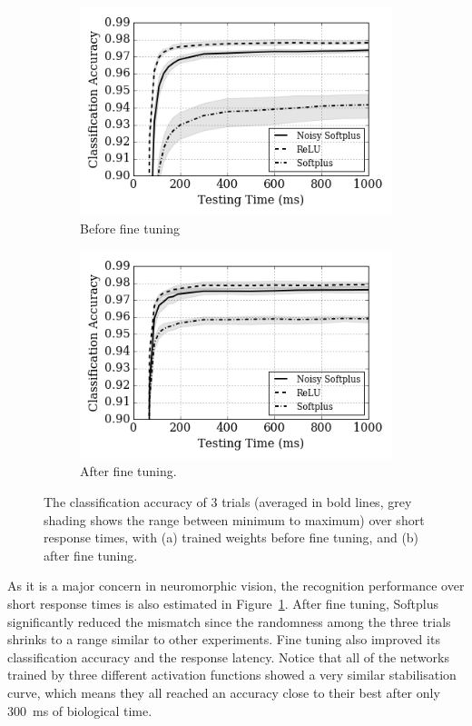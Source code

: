 	\begin{figure}[htb!]
		\centering
		\begin{subfigure}[t]{0.49\textwidth}
			\includegraphics[width=\textwidth]{pics_iconip/8-2.png}
			\caption{Before fine tuning}
		\end{subfigure}
		\begin{subfigure}[t]{0.49\textwidth}
			\includegraphics[width=\textwidth]{pics_iconip/8-3.png}
			\caption{After fine tuning.}
		\end{subfigure}

		\caption{The classification accuracy of 3 trials (averaged in bold lines, grey shading shows the range between minimum to maximum) over short response times, with (a) trained weights before fine tuning, and (b) after fine tuning.}
		\label{fig:ca_time}	
	\end{figure}

	As it is a major concern in neuromorphic vision, the recognition performance over short response times is also estimated in Figure~\ref{fig:ca_time}.
	After fine tuning, Softplus significantly reduced the mismatch since the randomness among the three trials shrinks to a range similar to other experiments.
	Fine tuning also improved its classification accuracy and the response latency.
	Notice that all of the networks trained by three different activation functions showed a very similar stabilisation curve, which means they all reached an accuracy close to their best after only 300~ms of biological time. 

